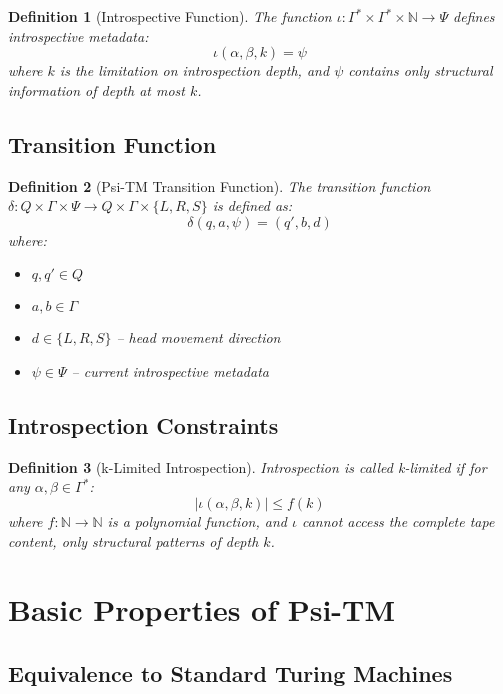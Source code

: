 \documentclass[11pt]{article}
\newtheorem{definition}{Definition}
\begin{document}
\begin{definition}[Introspective Function]
The function $\iota: \Gamma^* \times \Gamma^* \times \mathbb{N} \to \Psi$ defines introspective metadata:
$$\iota(\alpha, \beta, k) = \psi$$
where $k$ is the limitation on introspection depth, and $\psi$ contains only structural information of depth at most $k$.
\end{definition}

\subsection{Transition Function}

\begin{definition}[Psi-TM Transition Function]
The transition function $\delta: Q \times \Gamma \times \Psi \to Q \times \Gamma \times \{L, R, S\}$ is defined as:
$$\delta(q, a, \psi) = (q', b, d)$$
where:
\begin{itemize}
\item $q, q' \in Q$
\item $a, b \in \Gamma$
\item $d \in \{L, R, S\}$ -- head movement direction
\item $\psi \in \Psi$ -- current introspective metadata
\end{itemize}
\end{definition}

\subsection{Introspection Constraints}

\begin{definition}[k-Limited Introspection]
Introspection is called k-limited if for any $\alpha, \beta \in \Gamma^*$:
$$|\iota(\alpha, \beta, k)| \leq f(k)$$
where $f: \mathbb{N} \to \mathbb{N}$ is a polynomial function, and $\iota$ cannot access the complete tape content, only structural patterns of depth $k$.
\end{definition}

\section{Basic Properties of Psi-TM}

\subsection{Equivalence to Standard Turing Machines}
\end{document}
